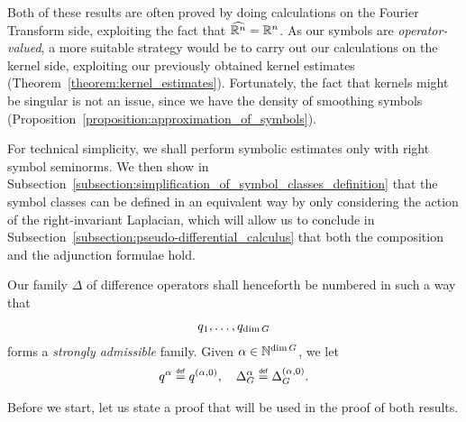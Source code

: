 Both of these results are often proved by doing calculations on the Fourier Transform side,
exploiting the fact that ${\widehat{\mathbb{R}^n}} = \mathbb{R}^n$.
As our symbols are \emph{operator-valued},
a more suitable strategy would be to carry out our calculations on the kernel side,
exploiting our previously obtained kernel estimates (Theorem~\ref{theorem:kernel_estimates}).
Fortunately,
the fact that kernels might be singular is not an issue,
since we have the density of smoothing symbols (Proposition~\ref{proposition:approximation_of_symbols}).

For technical simplicity,
we shall perform symbolic estimates only with right symbol seminorms.
We then show in Subsection~\ref{subsection:simplification_of_symbol_classes_definition}
that the symbol classes can be defined in an equivalent way by only considering the action of the right-invariant Laplacian,
which will allow us to conclude in Subsection~\ref{subsection:pseudo-differential_calculus} that both the composition and the adjunction formulae hold.

\begin{remark}
    Our family $\Delta$ of difference operators shall henceforth be numbered in such a way that
    \begin{align*}
        q_1, \dots, q_{\dim G}
    \end{align*}
    forms a \emph{strongly admissible} family.
    Given $\alpha \in \mathbb{N}^{\dim G}$,
    we let
    \begin{align*}
        q^\alpha \defeq q^{(\alpha, 0)},
        \quad
        \DifferenceOperatorOrder \alpha \defeq \DifferenceOperatorOrder {(\alpha, 0)}.
    \end{align*}
\end{remark}

Before we start,
let us state a proof that will be used in the proof of both results.

